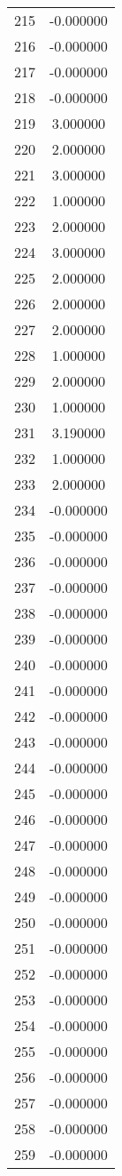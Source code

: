 \documentclass[12pt]{article}
\begin{document}
\begin{longtable}{@{}cc@{}}
215 & -0.000000 \\
216 & -0.000000 \\
217 & -0.000000 \\
218 & -0.000000 \\
219 & 3.000000 \\
220 & 2.000000 \\
221 & 3.000000 \\
222 & 1.000000 \\
223 & 2.000000 \\
224 & 3.000000 \\
225 & 2.000000 \\
226 & 2.000000 \\
227 & 2.000000 \\
228 & 1.000000 \\
229 & 2.000000 \\
230 & 1.000000 \\
231 & 3.190000 \\
232 & 1.000000 \\
233 & 2.000000 \\
234 & -0.000000 \\
235 & -0.000000 \\
236 & -0.000000 \\
237 & -0.000000 \\
238 & -0.000000 \\
239 & -0.000000 \\
240 & -0.000000 \\
241 & -0.000000 \\
242 & -0.000000 \\
243 & -0.000000 \\
244 & -0.000000 \\
245 & -0.000000 \\
246 & -0.000000 \\
247 & -0.000000 \\
248 & -0.000000 \\
249 & -0.000000 \\
250 & -0.000000 \\
251 & -0.000000 \\
252 & -0.000000 \\
253 & -0.000000 \\
254 & -0.000000 \\
255 & -0.000000 \\
256 & -0.000000 \\
257 & -0.000000 \\
258 & -0.000000 \\
259 & -0.000000 \\

\end{longtable}
\end{document}

